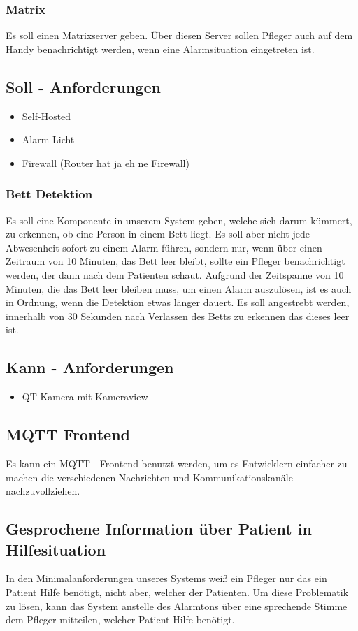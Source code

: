 \subsubsection{Matrix}
Es soll einen Matrixserver geben. Über diesen Server sollen Pfleger auch auf dem Handy benachrichtigt werden, wenn eine Alarmsituation eingetreten ist. 


\subsection{Soll - Anforderungen}
\begin{itemize}
  \item Self-Hosted
  \item Alarm Licht
  \item Firewall (Router hat ja eh ne Firewall)
\end{itemize}

\subsubsection{Bett Detektion}
Es soll eine Komponente in unserem System geben, welche sich darum kümmert, zu erkennen, ob eine Person in einem Bett liegt. Es soll aber nicht jede Abwesenheit sofort zu einem Alarm führen, sondern nur, wenn über einen Zeitraum von 10 Minuten, das Bett leer bleibt, sollte ein Pfleger benachrichtigt werden, der dann nach dem Patienten schaut. Aufgrund der Zeitspanne von 10 Minuten, die das Bett leer bleiben muss, um einen Alarm auszulösen, ist es auch in Ordnung, wenn die Detektion etwas länger dauert. Es soll angestrebt werden, innerhalb von 30 Sekunden nach Verlassen des Betts zu erkennen das dieses leer ist. 

\subsection{Kann - Anforderungen}
\begin{itemize}
  \item QT-Kamera mit Kameraview
\end{itemize}

\subsection{MQTT Frontend}
Es kann ein MQTT - Frontend benutzt werden, um es Entwicklern einfacher zu machen die verschiedenen Nachrichten und Kommunikationskanäle nachzuvollziehen. 

\subsection{Gesprochene Information über Patient in Hilfesituation}
In den Minimalanforderungen unseres Systems weiß ein Pfleger nur das ein Patient Hilfe benötigt, nicht aber, welcher der Patienten. Um diese Problematik zu lösen, kann das System anstelle des Alarmtons über eine sprechende Stimme dem Pfleger mitteilen, welcher Patient Hilfe benötigt. 

